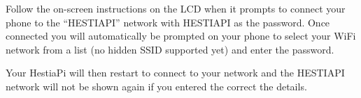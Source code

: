 Follow the on-screen instructions on the LCD when it prompts to connect your
phone to the ``HESTIAPI'' network with HESTIAPI as the password. Once connected
you will automatically be prompted on your phone to select your WiFi network
from a list (no hidden SSID supported yet) and enter the password.

Your HestiaPi will then restart to connect to your network and the HESTIAPI
network will not be shown again if you entered the correct the details.

